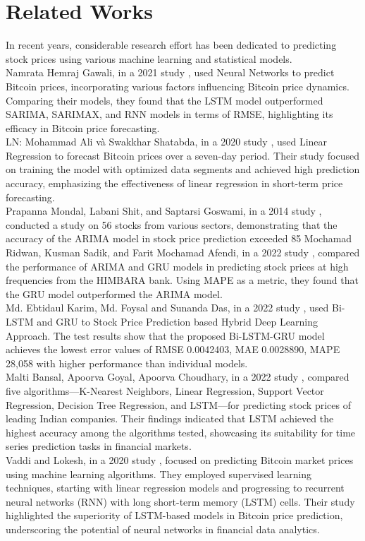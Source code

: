 \documentclass{ieeeojies}
\begin{document}
\section{Related Works}
In recent years, considerable research effort has been dedicated to predicting stock prices using various machine learning and statistical models.\\
Namrata Hemraj Gawali, in a 2021 study \cite{b1}, used Neural Networks to predict Bitcoin prices, incorporating various factors influencing Bitcoin price dynamics. Comparing their models, they found that the LSTM model outperformed SARIMA, SARIMAX, and RNN models in terms of RMSE, highlighting its efficacy in Bitcoin price forecasting.\\
LN: Mohammad Ali và Swakkhar Shatabda, in a 2020 study \cite{b2}, used Linear Regression to forecast Bitcoin prices over a seven-day period. Their study focused on training the model with optimized data segments and achieved high prediction accuracy, emphasizing the effectiveness of linear regression in short-term price forecasting.\\
Prapanna Mondal, Labani Shit, and Saptarsi Goswami, in a 2014 study \cite{b3},  conducted a study on 56 stocks from various sectors, demonstrating that the accuracy of the ARIMA model in stock price prediction exceeded 85%
Mochamad Ridwan, Kusman Sadik, and Farit Mochamad Afendi, in a 2022 study \cite{b4}, compared the performance of ARIMA and GRU models in predicting stock prices at high frequencies from the HIMBARA bank. Using MAPE as a metric, they found that the GRU model outperformed the ARIMA model.\\
Md. Ebtidaul Karim, Md. Foysal and Sunanda Das, in a 2022 study \cite{b5}, used Bi-LSTM and GRU to Stock Price Prediction based Hybrid Deep Learning Approach. The test results show that the proposed Bi-LSTM-GRU model achieves the lowest error values of RMSE 0.0042403, MAE 0.0028890, MAPE 28,058 with higher performance than individual models.\\
Malti Bansal, Apoorva Goyal, Apoorva Choudhary, in a 2022 study \cite{b6}, compared five algorithms—K-Nearest Neighbors, Linear Regression, Support Vector Regression, Decision Tree Regression, and LSTM—for predicting stock prices of leading Indian companies. Their findings indicated that LSTM achieved the highest accuracy among the algorithms tested, showcasing its suitability for time series prediction tasks in financial markets.\\
Vaddi and Lokesh, in a 2020 study \cite{b7}, focused on predicting Bitcoin market prices using machine learning algorithms. They employed supervised learning techniques, starting with linear regression models and progressing to recurrent neural networks (RNN) with long short-term memory (LSTM) cells. Their study highlighted the superiority of LSTM-based models in Bitcoin price prediction, underscoring the potential of neural networks in financial data analytics.
\end{document}
